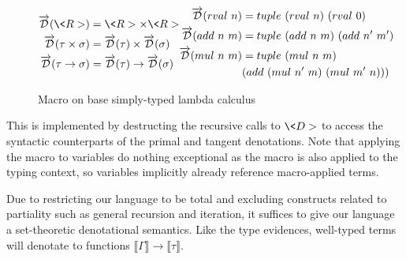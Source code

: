 \documentclass[11pt, final]{article}
\begin{document}
  \begin{figure}
    \centering
    \begin{equation*}
      \begin{split}
        \D(\<R>) &= \<R> \times \<R> \\
        \D(\tau \times \sigma) &= \D(\tau) \times \D(\sigma) \\
        \D(\tau \rightarrow \sigma) &= \D(\tau) \rightarrow \D(\sigma)
      \end{split}
      \begin{split}
        \D(\rval{n}) &= \tuple{(\rval{n})}{(\rval{0})} \\
        \D(\add{n}{m}) &= \tuple{(\add{n}{m})}{(\add{n'}{m'})} \\
        \D(\mul{n}{m}) &= \tuple{(\mul{n}{m})} \\
          &{(\add{(\mul{n'}{m})}{(\mul{m'}{n})})})
      \end{split}
    \end{equation*}
    \caption{Macro on base simply-typed lambda calculus}
    \label{eqn:macro_base}
  \end{figure}

  This is implemented by destructing the recursive calls to $\<D>$ to access the syntactic counterparts of the primal and tangent denotations.
  Note that applying the macro to variables do nothing exceptional as the macro is also applied to the typing context, so variables implicitly already reference macro-applied terms.

  Due to restricting our language to be total and excluding constructs related to partiality such as general recursion and iteration, it suffices to give our language a set-theoretic denotational semantics.
  Like the type evidences, well-typed terms will denotate to functions $\llbracket \Gamma \rrbracket \rightarrow \llbracket \tau \rrbracket$.
\end{document}
